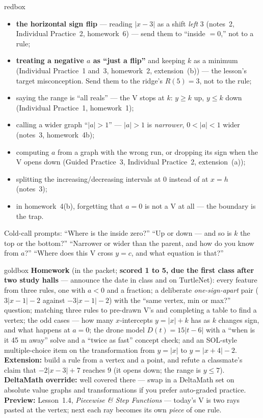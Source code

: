 \documentclass[10pt]{article}
\begin{document}
\boxguard
\begin{skillbox}{redbox}
\begin{itemize}[leftmargin=1.2em, nosep]
  \item \textbf{the horizontal sign flip} --- reading $|x-3|$ as a shift \emph{left} $3$
        (notes~2, Individual Practice~2, homework~6) --- send them to ``inside $=0$,'' not to a rule;
  \item \textbf{treating a negative $a$ as ``just a flip''} and keeping $k$ as a minimum
        (Individual Practice~1 and~3, homework~2, extension~(b)) --- the lesson's target
        misconception. Send them to the ridge's $R(5)=3$, not to the rule;
  \item saying the range is ``all reals'' --- the V stops at $k$: $y\ge k$ up, $y\le k$ down
        (Individual Practice~1, homework~1);
  \item calling a wider graph ``$|a|>1$'' --- $|a|>1$ is \emph{narrower}, $0<|a|<1$ wider
        (notes~3, homework~4b);
  \item computing $a$ from a graph with the wrong run, or dropping its sign when the V opens down
        (Guided Practice~3, Individual Practice~2, extension~(a));
  \item splitting the increasing/decreasing intervals at $0$ instead of at $x=h$ (notes~3);
  \item in homework~4(b), forgetting that $a=0$ is not a V at all --- the boundary is the trap.
\end{itemize}
Cold-call prompts: ``Where is the inside zero?'' ``Up or down --- and so is $k$ the top or the
bottom?'' ``Narrower or wider than the parent, and how do you know from $a$?'' ``Where does this V
cross $y=c$, and what equation is that?''
\end{skillbox}

\boxguard
\begin{skillbox}{goldbox}
\textbf{Homework} (in the packet; \textbf{scored 1 to 5, due the first class after two study halls} ---
announce the date in class and on TurtleNet): every feature from three rules, one with $a<0$ and a
fraction; a deliberate \emph{one-sign-apart} pair ($3|x-1|-2$ against $-3|x-1|-2$) with the ``same
vertex, min or max?'' question; matching three rules to pre-drawn V's and completing a table to
find a vertex; the odd cases --- how many $x$-intercepts $y=|x|+k$ has as $k$ changes sign, and
what happens at $a=0$; the drone model $D(t)=15|t-6|$ with a ``when is it 45 m away'' solve and a
``twice as fast'' concept check; and an SOL-style multiple-choice item on the transformation from
$y=|x|$ to $y=|x+4|-2$. \textbf{Extension:} build a rule from a vertex and a point, and refute a
classmate's claim that $-2|x-3|+7$ reaches $9$ (it opens down; the range is $y\le7$).
\textbf{DeltaMath override:} well covered there --- swap in a DeltaMath set on absolute value
graphs and transformations if you prefer auto-graded practice. \textbf{Preview:} Lesson~1.4,
\emph{Piecewise \& Step Functions} --- today's V is two rays pasted at the vertex; next each ray
becomes its own \emph{piece} of one rule.
\end{skillbox}
\end{document}
